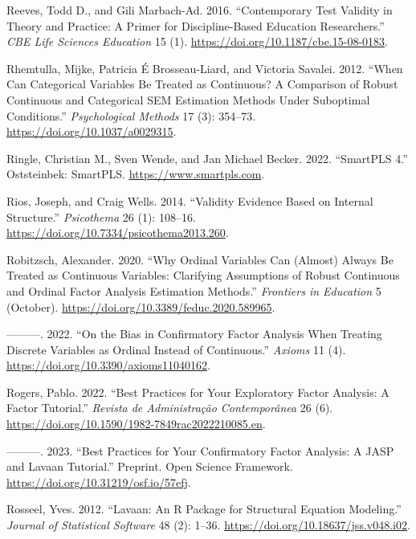 \documentclass[
  a4paper,
]{article}
\newlength{\cslhangindent}
\newenvironment{CSLReferences}[2] %
 {\begin{list}{}{%
  \setlength{\itemindent}{0pt}
  \setlength{\leftmargin}{0pt}
  \setlength{\parsep}{0pt}
  \ifodd #1
   \setlength{\leftmargin}{\cslhangindent}
   \setlength{\itemindent}{-1\cslhangindent}
  \fi
  \setlength{\itemsep}{#2\baselineskip}}}
 {\end{list}}
\begin{document}
\begin{CSLReferences}{1}{0}
Reeves, Todd D., and Gili Marbach-Ad. 2016. {``Contemporary Test
Validity in Theory and Practice: {A} Primer for Discipline-Based
Education Researchers.''} \emph{CBE Life Sciences Education} 15 (1).
\url{https://doi.org/10.1187/cbe.15-08-0183}.

Rhemtulla, Mijke, Patricia É Brosseau-Liard, and Victoria Savalei. 2012.
{``When Can Categorical Variables Be Treated as Continuous? {A}
Comparison of Robust Continuous and Categorical {SEM} Estimation Methods
Under Suboptimal Conditions.''} \emph{Psychological Methods} 17 (3):
354--73. \url{https://doi.org/10.1037/a0029315}.

Ringle, Christian M., Sven Wende, and Jan Michael Becker. 2022.
{``{SmartPLS} 4.''} Oststeinbek: SmartPLS.
\url{https://www.smartpls.com}.

Rios, Joseph, and Craig Wells. 2014. {``Validity Evidence Based on
Internal Structure.''} \emph{Psicothema} 26 (1): 108--16.
\url{https://doi.org/10.7334/psicothema2013.260}.

Robitzsch, Alexander. 2020. {``Why {Ordinal Variables Can} ({Almost})
{Always Be Treated} as {Continuous Variables}: {Clarifying Assumptions}
of {Robust Continuous} and {Ordinal Factor Analysis Estimation
Methods}.''} \emph{Frontiers in Education} 5 (October).
\url{https://doi.org/10.3389/feduc.2020.589965}.

---------. 2022. {``On the {Bias} in {Confirmatory Factor Analysis When
Treating Discrete Variables} as {Ordinal Instead} of {Continuous}.''}
\emph{Axioms} 11 (4). \url{https://doi.org/10.3390/axioms11040162}.

Rogers, Pablo. 2022. {``Best {Practices} for {Your Exploratory Factor
Analysis}: {A Factor Tutorial}.''} \emph{Revista de Administra{ç}{ã}o
Contempor{â}nea} 26 (6).
\url{https://doi.org/10.1590/1982-7849rac2022210085.en}.

---------. 2023. {``Best {Practices} for Your {Confirmatory Factor
Analysis}: {A JASP} and Lavaan {Tutorial}.''} Preprint. Open Science
Framework. \url{https://doi.org/10.31219/osf.io/57efj}.

Rosseel, Yves. 2012. {``Lavaan: {An R} Package for Structural Equation
Modeling.''} \emph{Journal of Statistical Software} 48 (2): 1--36.
\url{https://doi.org/10.18637/jss.v048.i02}.


\end{CSLReferences}
\end{document}
